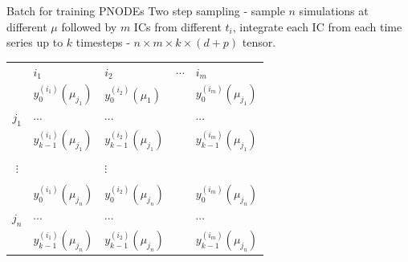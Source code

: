 \documentclass[usenames,dvipsnames]{beamer}
\theoremstyle{definition}
\let\oldcite=\cite
\renewcommand{\cite}[2][]{\textcolor{green}{\oldcite[#1]{#2}}}
\begin{document}
\begin{frame}{Batch for training PNODEs}
    Two step sampling - sample $n$ simulations at different $\mu$ followed by $m$ ICs from different $t_i$, integrate each IC from each time series up to $k$ timesteps - $n \times m \times k \times (d + p)$ tensor.

\begin{table}[]
\centering
\begin{tabular}{cllll}
                          & $i_1$                    & $i_2$                    & $\cdots$ & $i_m$                    \\
\multirow{3}{*}{$j_1$}        & $y_0^{(i_1)}(\mu_{j_1})$     & $y_0^{(i_2)}(\mu_1)$     &          & $y_0^{(i_m)}(\mu_{j_1})$     \\
                          & $\cdots$                 & $\cdots$                 &          & $\cdots$                 \\
                          & $y_{k-1}^{(i_1)}(\mu_{j_1})$ & $y_{k-1}^{(i_2)}(\mu_{j_1})$ &          & $y_{k-1}^{(i_m)}(\mu_{j_1})$ \\
\multirow{3}{*}{$\vdots$} &                          &                          &          &                          \\
                          &                          & $\vdots$                 &          &                          \\
                          &                          &                          &          &                          \\
\multirow{3}{*}{$j_n$}        & $y_0^{(i_1)}(\mu_{j_n})$     & $y_0^{(i_2)}(\mu_{j_n})$     &          & $y_0^{(i_m)}(\mu_{j_n})$     \\
                          & $\cdots$                 & $\cdots$                 &          & $\cdots$                 \\
                          & $y_{k-1}^{(i_1)}(\mu_{j_n})$ & $y_{k-1}^{(i_2)}(\mu_{j_n})$ &          & $y_{k-1}^{(i_m)}(\mu_{j_n})$
\end{tabular}
\label{tab: train_tensor}
\end{table}
\end{frame}

\end{document}
